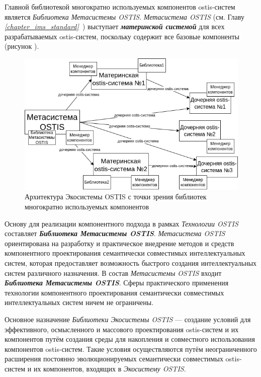 Главной библиотекой многократно используемых компонентов ostis-систем является \textit{Библиотека Метасистемы OSTIS}. \textit{Метасистема OSTIS} (см. Главу \textit{\ref{chapter_ims_standard}~}) выступает \textbf{\textit{материнской системой}} для всех разрабатываемых ostis-систем, поскольку содержит все базовые компоненты (рисунок \textit{}).

\begin{figure}[H]
	\includegraphics[scale=0.8]{author/part5/figures/ecosystem_architecture.png}
	\caption{Архитектура Экосистемы OSTIS с точки зрения библиотек многократно используемых компонентов}
	\label{fig:ecosystem_architecture}
\end{figure}

Основу для реализации компонентного подхода в рамках \textit{Технологии OSTIS} составляет \textbf{\textit{Библиотека Метасистемы OSTIS}}. \textit{Метасистема OSTIS} ориентирована на разработку и практическое внедрение методов и средств компонентного проектирования семантически совместимых интеллектуальных систем, которая предоставляет возможность быстрого создания интеллектуальных систем различного назначения. В состав \textit{Метасистемы OSTIS} входит \textbf{\textit{Библиотека Метасистемы OSTIS}}. Сферы практического применения технологии компонентного проектирования семантически совместимых интеллектуальных систем ничем не ограничены.

Основное назначение \textit{Библиотеки Экосистемы OSTIS} --- создание условий для эффективного, осмысленного и массового проектирования ostis-систем и их компонентов путём создания среды для накопления и совместного использования компонентов ostis-систем. Такие условия осуществляются путём неограниченного расширения постоянно эволюционируемых семантически совместимых ostis-систем и их компонентов, входящих в \textit{Экосистему OSTIS}.


